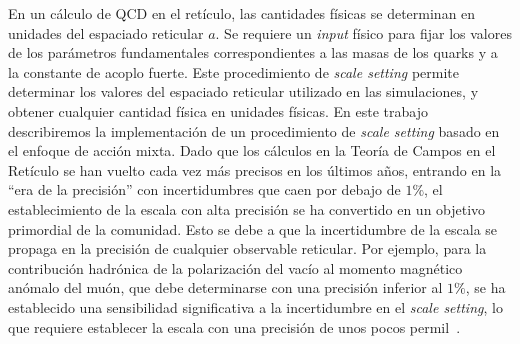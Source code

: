 En un cálculo de QCD en el retículo, las cantidades físicas se determinan en unidades del espaciado reticular $a$. Se requiere un \textit{input} físico para fijar los valores de los parámetros fundamentales correspondientes a las masas de los quarks y a la constante de acoplo fuerte. Este procedimiento de \textit{scale setting} permite determinar los valores del espaciado reticular utilizado en las simulaciones, y obtener cualquier cantidad física en unidades físicas. En este trabajo describiremos la implementación de un procedimiento de \textit{scale setting} basado en el enfoque de acción mixta. Dado que los cálculos en la Teoría de Campos en el Retículo se han vuelto cada vez más precisos en los últimos años, entrando en la ``era de la precisión'' con incertidumbres que caen por debajo de $1\%$, el establecimiento de la escala con alta precisión se ha convertido en un objetivo primordial de la comunidad. Esto se debe a que la incertidumbre de la escala se propaga en la precisión de cualquier observable reticular. Por ejemplo, para la contribución hadrónica de la polarización del vacío al momento magnético anómalo del muón, que debe determinarse con una precisión inferior al $1\%$, se ha establecido una sensibilidad significativa a la incertidumbre en el \textit{scale setting}, lo que requiere establecer la escala con una precisión de unos pocos permil~\citep{Borsanyi:2020mff}.

